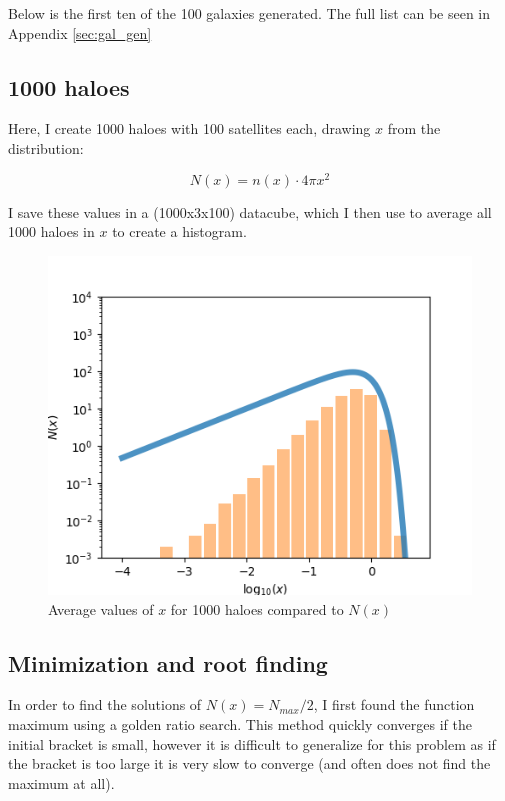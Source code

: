     Below is the first ten of the 100 galaxies generated. The full list can be seen in Appendix \ref{sec:gal_gen}

    


    \newpage
    \subsection{1000 haloes}

    Here, I create 1000 haloes with 100 satellites each, drawing $x$ from the distribution:

    \begin{equation}
        N(x) = n(x) \cdot 4 \pi x^2
    \end{equation}

    I save these values in a (1000x3x100) datacube, which I then use to average all 1000 haloes in $x$ to create a histogram.

    

    \begin{figure}[H]
        \centering
        \includegraphics[width=.5\textwidth]{output/2e_average-r.png}
        \caption{Average values of $x$ for 1000 haloes compared to $N(x)$}
    \end{figure}



    \newpage
    \subsection{Minimization and root finding}

    In order to find the solutions of $N(x) = N_{max}/2$, I first found the function maximum using a golden ratio search. This method quickly converges if the initial bracket is small, however it is difficult to generalize for this problem as if the bracket is too large it is very slow to converge (and often does not find the maximum at all).


